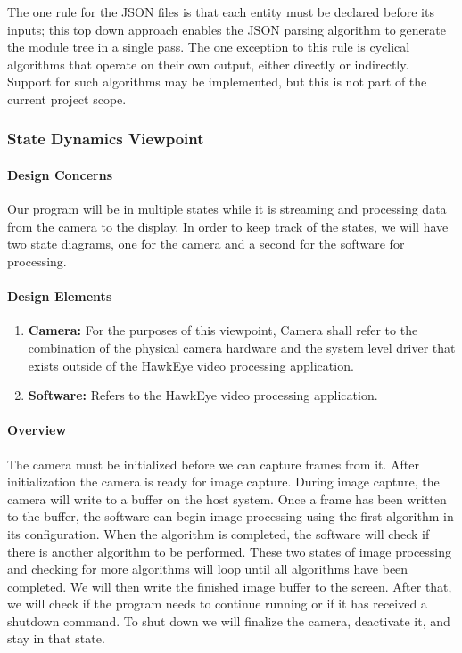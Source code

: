 	The one rule for the JSON files is that each entity must be declared before its inputs; this top down approach enables the JSON parsing algorithm to generate the module tree in a single pass. The one exception to this rule is cyclical algorithms that operate on their own output, either directly or indirectly. Support for such algorithms may be implemented, but this is not part of the current project scope. 
	
\subsubsection{State Dynamics Viewpoint}
	\paragraph{Design Concerns}
	Our program will be in multiple states while it is streaming and processing data from the camera to the display. In order to keep track of the states, we will have two state diagrams, one for the camera and a second for the software for processing.\\
	
	\paragraph{Design Elements}
	
	\begin{enumerate}[leftmargin=2cm,labelindent=2cm]
	\item \textbf{Camera:}
	For the purposes of this viewpoint, Camera shall refer to the combination of the physical camera hardware and the system level driver that exists 	outside of the HawkEye video processing application.

	\item \textbf{Software:}
	Refers to the HawkEye video processing application.\\
	\end{enumerate}
	
	\paragraph{Overview}
	The camera must be initialized before we can capture frames from it. After initialization the camera is ready for image capture. During image capture, the camera will write to a buffer on the host system. Once a frame has been written to the buffer, the software can begin image processing using the first algorithm in its configuration. When the algorithm is completed, the software will check if there is another algorithm to be performed. These two states of image processing and checking for more algorithms will loop until all algorithms have been completed. We will then write the finished image buffer to the screen. After that, we will check if the program needs to continue running or if it has received a shutdown command. To shut down we will finalize the camera, deactivate it, and stay in that state. \\
